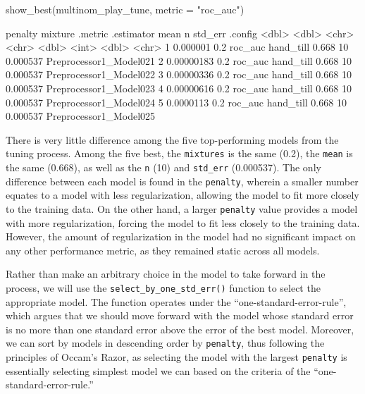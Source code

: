 \documentclass[
  letterpaper,
]{krantz}
\newenvironment{Shaded}{\begin{snugshade}}{\end{snugshade}}
\newcommand{\AttributeTok}[1]{\textcolor[rgb]{0.40,0.45,0.13}{#1}}
\newcommand{\FunctionTok}[1]{\textcolor[rgb]{0.28,0.35,0.67}{#1}}
\newcommand{\NormalTok}[1]{\textcolor[rgb]{0.00,0.23,0.31}{#1}}
\newcommand{\StringTok}[1]{\textcolor[rgb]{0.13,0.47,0.30}{#1}}
\begin{document}
\begin{Shaded}
\begin{Highlighting}[]
\FunctionTok{show\_best}\NormalTok{(multinom\_play\_tune, }\AttributeTok{metric =} \StringTok{"roc\_auc"}\NormalTok{)}

\StringTok{\textasciigrave{}}
\AttributeTok{     penalty mixture .metric .estimator  mean     n  std\_err .config               }
\AttributeTok{       \textless{}dbl\textgreater{}   \textless{}dbl\textgreater{} \textless{}chr\textgreater{}   \textless{}chr\textgreater{}      \textless{}dbl\textgreater{} \textless{}int\textgreater{}    \textless{}dbl\textgreater{} \textless{}chr\textgreater{}                 }
\AttributeTok{1 0.000001       0.2 roc\_auc hand\_till  0.668    10 0.000537 Preprocessor1\_Model021}
\AttributeTok{2 0.00000183     0.2 roc\_auc hand\_till  0.668    10 0.000537 Preprocessor1\_Model022}
\AttributeTok{3 0.00000336     0.2 roc\_auc hand\_till  0.668    10 0.000537 Preprocessor1\_Model023}
\AttributeTok{4 0.00000616     0.2 roc\_auc hand\_till  0.668    10 0.000537 Preprocessor1\_Model024}
\AttributeTok{5 0.0000113      0.2 roc\_auc hand\_till  0.668    10 0.000537 Preprocessor1\_Model025}\StringTok{\textasciigrave{}}
\end{Highlighting}
\end{Shaded}

There is very little difference among the five top-performing models
from the tuning process. Among the five best, the \texttt{mixtures} is
the same (0.2), the \texttt{mean} is the same (0.668), as well as the
\texttt{n} (10) and \texttt{std\_err} (0.000537). The only difference
between each model is found in the \texttt{penalty}, wherein a smaller
number equates to a model with less regularization, allowing the model
to fit more closely to the training data. On the other hand, a larger
\texttt{penalty} value provides a model with more regularization,
forcing the model to fit less closely to the training data. However, the
amount of regularization in the model had no significant impact on any
other performance metric, as they remained static across all models.

Rather than make an arbitrary choice in the model to take forward in the
process, we will use the \texttt{select\_by\_one\_std\_err()} function
to select the appropriate model. The function operates under the
``one-standard-error-rule'', which argues that we should move forward
with the model whose standard error is no more than one standard error
above the error of the best model. Moreover, we can sort by models in
descending order by \texttt{penalty}, thus following the principles of
Occam's Razor, as selecting the model with the largest \texttt{penalty}
is essentially selecting simplest model we can based on the criteria of
the ``one-standard-error-rule.''
\end{document}
